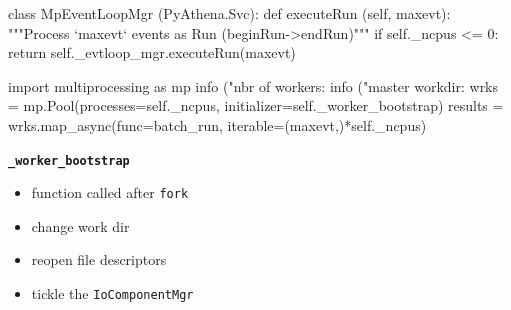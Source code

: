 \documentclass[10pt]{beamer}
\newcommand{\myred}  [1] {{\color{red}#1}}
\begin{document}
\begin{frame}[fragile]{}

\begin{python}
class MpEventLoopMgr (PyAthena.Svc):
    def executeRun (self, maxevt):
        """Process `maxevt` events as Run (beginRun->endRun)"""
        if self._ncpus <= 0:
            return self._evtloop_mgr.executeRun(maxevt)

        import multiprocessing as mp
        info ("nbr of workers: %
        info ("master workdir: %
        wrks = mp.Pool(processes=self._ncpus,
                       initializer=self._worker_bootstrap)
        results = wrks.map_async(func=batch_run,
                                 iterable=(maxevt,)*self._ncpus)
\end{python}

\begin{exampleblock}{\bf{\myred{\texttt{\_worker\_bootstrap}}}}
\begin{itemize}
  \item function called after \texttt{fork}
  \item change work dir
  \item reopen file descriptors
  \item tickle the \texttt{IoComponentMgr}
\end{itemize}
\end{exampleblock}
\end{frame}
\end{document}
